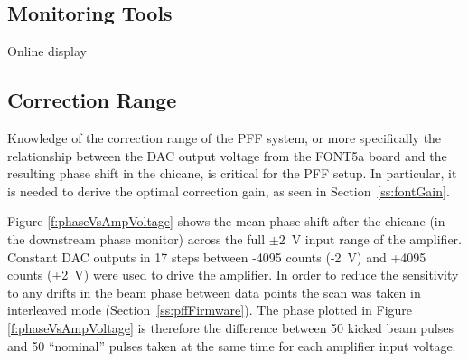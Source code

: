 \subsection{Monitoring Tools}
\label{ss:monTools}

Online display



\subsection{Correction Range}
\label{ss:corrRange}

Knowledge of the correction range of the PFF system, or more specifically the relationship between the DAC output voltage from the FONT5a board and the resulting phase shift in the chicane, is critical for the PFF setup. In particular, it is needed to derive the optimal
correction gain, as seen in Section~\ref{ss:fontGain}.


Figure \ref{f:phaseVsAmpVoltage} shows the mean phase shift after the chicane (in the downstream phase monitor) across the full \(\pm2\)~V input range of the amplifier. Constant DAC outputs in 17 steps between -4095 counts (-2~V) and +4095 counts (+2~V) were used to drive the amplifier. In order to reduce the sensitivity to any drifts in the beam phase between data points the scan was taken in interleaved mode (Section~\ref{ss:pffFirmware}). The phase plotted in Figure \ref{f:phaseVsAmpVoltage} is therefore the difference between 50 kicked beam pulses and 50 ``nominal'' pulses taken at the same time for each amplifier input voltage. 

